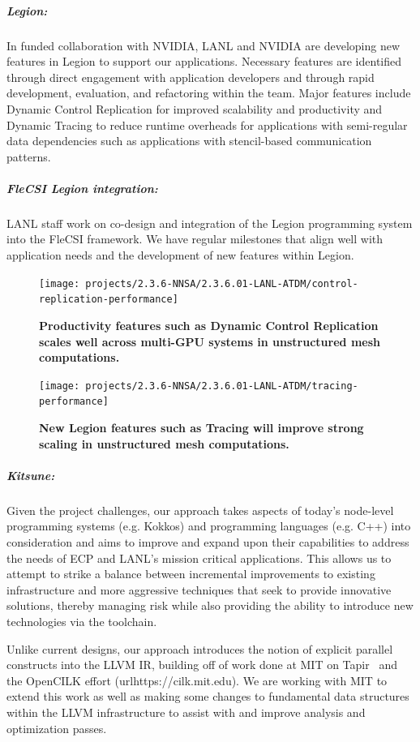 \subparagraph{Legion:}

In funded collaboration with NVIDIA, LANL and NVIDIA are developing new features in Legion to support our applications. Necessary features are identified through direct engagement with application developers and through rapid development, evaluation, and refactoring within the team. Major features include Dynamic Control Replication for improved scalability and productivity and Dynamic Tracing to reduce runtime overheads for  applications with semi-regular data dependencies such as applications with stencil-based communication patterns. 


\subparagraph{FleCSI Legion integration:}
LANL staff work on co-design and integration of the Legion programming system into the FleCSI framework. We have regular milestones that align well with application needs and the development of new features within Legion. 


\begin{figure}[htb]
  \centering
  \texttt{[image: projects/2.3.6-NNSA/2.3.6.01-LANL-ATDM/control-replication-performance]}
        \caption{\label{fig:control-replication-performance}\textbf{Productivity features such as Dynamic Control Replication scales well across multi-GPU systems in unstructured mesh computations.}}
\end{figure}

\begin{figure}[htb]
        \centering
        \texttt{[image: projects/2.3.6-NNSA/2.3.6.01-LANL-ATDM/tracing-performance]}
        \caption{\label{fig:tracing-performance}\textbf{New Legion features such as Tracing will improve strong scaling in unstructured mesh computations.}}
\end{figure}


\subparagraph{Kitsune:}
Given the project challenges, our approach takes aspects of
today's node-level programming systems (e.g. Kokkos) and
programming languages (e.g. C++) into consideration and aims to improve
and expand upon their capabilities to address the needs of ECP and LANL's
mission critical applications.  This allows us to attempt to strike a
balance between incremental improvements to existing infrastructure
and more aggressive techniques that seek to provide innovative
solutions, thereby managing risk while also providing the ability to
introduce new technologies via the toolchain. 

Unlike current designs, our approach introduces the notion of explicit
parallel constructs into the LLVM IR, building
off of work done at MIT on Tapir~\cite{2.3.6.01:kitsune:Schardl:2017}
and the OpenCILK effort (url{https://cilk.mit.edu}). We are working with
MIT to extend this work as well as making some changes to fundamental data
structures within the LLVM infrastructure to assist with and improve analysis
and optimization passes. 

